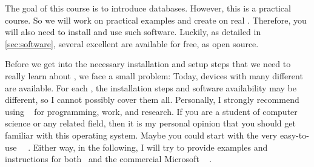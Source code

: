 %
%
%
The goal of this course is to introduce databases.
However, this is a practical course.
So we will work on practical examples and create   on real .
Therefore, you will also need to install and use such software.
Luckily, as detailed in \cref{sec:software}, several excellent  are available for free, as open source.

Before we get into the necessary installation and setup steps that we need to really learn about , we face a small problem:
Today, devices with many different  are available.
For each , the installation steps and software availability may be different, so I cannot possibly cover them all.
Personally, I strongly recommend using \linux~\cite{T1999TLE,B2022ELATCL,H2022LML} for programming, work, and research.
If you are a student of computer science or any related field, then it is my personal opinion that you should get familiar with this operating system.
Maybe you could start with the very easy-to-use \ubuntu\ \linux~\cite{CN2020ULB,H2020ULU2E}.
Either way, in the following, I will try to provide examples and instructions for both \ubuntu\ and the commercial Microsoft \windows~\cite{B2023W1IO} .
%
%
%
%
\endhsection%
%
